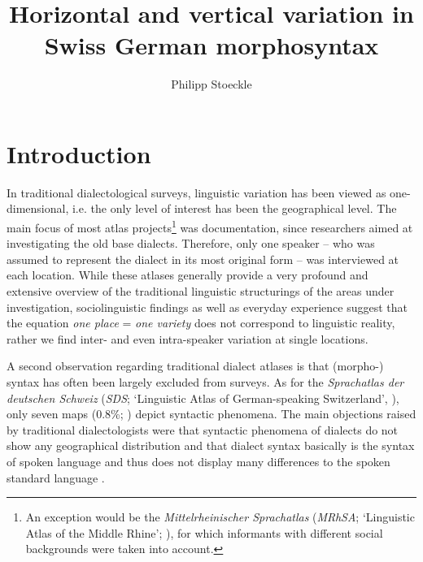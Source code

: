 \documentclass[output=paper]{LSP/langsci}
\author{Philipp Stoeckle\affiliation{University of Zürich}}
\title{Horizontal and vertical variation in {Swiss German} morphosyntax}
\begin{document}
 

\section{Introduction}
In traditional dialectological surveys, linguistic variation has been viewed as one-dimensional, i.e. the only level of interest has been the geographical level. The main focus of most atlas projects\footnote{ An exception would be the \emph{Mittelrheinischer Sprachatlas} (\emph{MRhSA}; ‘Linguistic Atlas of the Middle Rhine’; \citealt{bellmann_mittelrheinischer_1994}), for which informants with different social backgrounds were taken into account.} was documentation, since researchers aimed at investigating the old base dialects. Therefore, only one speaker – who was assumed to represent the dialect in its most original form – was interviewed at each location. While these atlases generally provide a very profound and extensive overview of the traditional linguistic structurings of the areas under investigation, sociolinguistic findings as well as everyday experience suggest that the equation \emph{one place} = \emph{one variety} does not correspond to linguistic reality, rather we find inter- and even intra-speaker variation at single locations.

A second observation regarding traditional dialect atlases is that (morpho-) syntax has often been largely excluded from surveys. As for the \emph{Sprachatlas der deutschen Schweiz} (\emph{SDS}; ‘Linguistic Atlas of German-speaking Switzerland’, \citealt{hotzenkocherle_sprachatlas_1962}), only seven maps (0.8\%; \citealt[42]{bucheli_syntactic_2002}) depict syntactic phenomena. The main objections raised by traditional dialectologists were that syntactic phenomena of dialects do not show any geographical distribution and that dialect syntax basically is the syntax of spoken language and thus does not display many differences to the spoken standard language \citep[109]{loffler_dialektologie._2003}.
\end{document}
